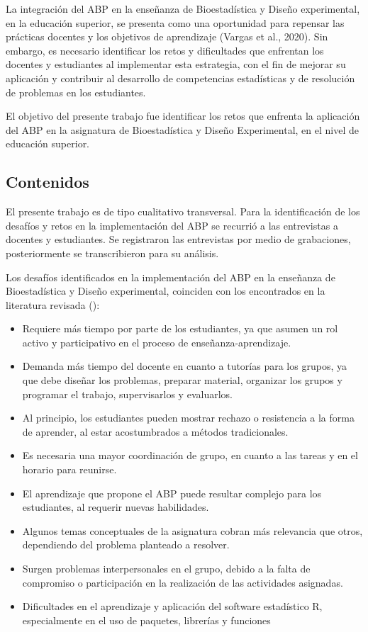 La integración del ABP en la enseñanza de Bioestadística y Diseño experimental, en la educación superior, se presenta como una oportunidad para repensar las prácticas docentes y los objetivos de aprendizaje (Vargas et al., 2020). Sin embargo, es necesario identificar los retos y dificultades que enfrentan los docentes y estudiantes al implementar esta estrategia, con el fin de mejorar su aplicación y contribuir al desarrollo de competencias estadísticas y de resolución de problemas en los estudiantes.

El objetivo del presente trabajo fue identificar los retos que enfrenta la aplicación del ABP en la asignatura de Bioestadística y Diseño Experimental, en el nivel de educación superior.

\subsection{Contenidos}

El presente trabajo es de tipo cualitativo transversal. Para la identificación de los desafíos y retos en la implementación del ABP se recurrió a las entrevistas a docentes y estudiantes. Se registraron las entrevistas por medio de grabaciones, posteriormente se transcribieron para su análisis.

Los desafíos identificados en la implementación del ABP en la enseñanza de Bioestadística y Diseño experimental, coinciden con los encontrados en la literatura revisada (\textcite{gonzalezhernando2016, paredescurin2016}):
\begin{itemize}
	\item Requiere más tiempo por parte de los estudiantes, ya que asumen un rol activo y participativo en el proceso de enseñanza-aprendizaje.
	\item Demanda más tiempo del docente en cuanto a tutorías para los grupos, ya que debe diseñar los problemas, preparar material, organizar los grupos y programar el trabajo, supervisarlos y evaluarlos.
	\item Al principio, los estudiantes pueden mostrar rechazo o resistencia a la forma de aprender, al estar acostumbrados a métodos tradicionales.
	\item Es necesaria una mayor coordinación de grupo, en cuanto a las tareas y en el horario para reunirse.
	\item El aprendizaje que propone el ABP puede resultar complejo para los estudiantes, al requerir nuevas habilidades.
	\item Algunos temas conceptuales de la asignatura cobran más relevancia que otros, dependiendo del problema planteado a resolver.
	\item Surgen problemas interpersonales en el grupo, debido a la falta de compromiso o participación en la realización de las actividades asignadas.
	\item Dificultades en el aprendizaje y aplicación del software estadístico R, especialmente en el uso de paquetes, librerías y funciones
\end{itemize}

